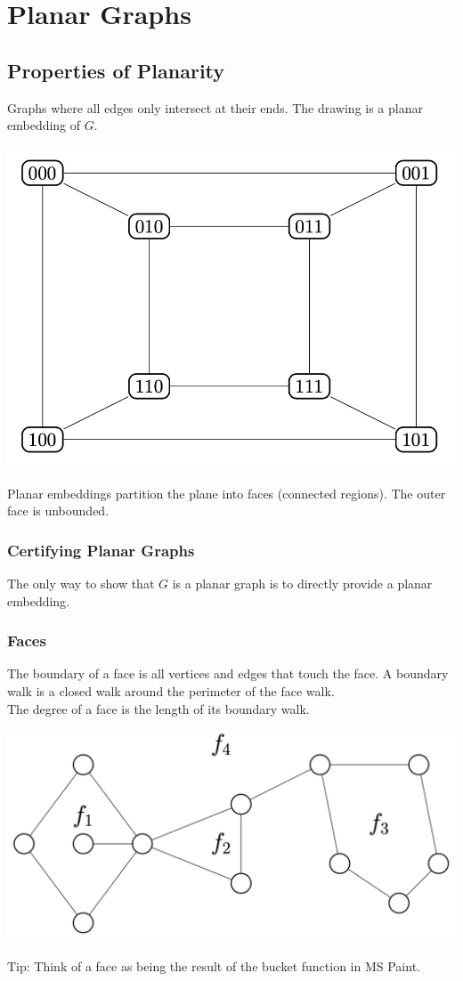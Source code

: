 \documentclass[11pt]{article}
\newcommand{\nl}{\\[5pt]}
\begin{document}
\newpage
\section{Planar Graphs}
\subsection{Properties of Planarity}
Graphs where all edges only intersect at their ends. The drawing is a planar embedding of $G$. 
\begin{center}
    \includegraphics[scale=0.4]{Figures/Hypercube.png}
\end{center}
Planar embeddings partition the plane into faces (connected regions). The outer face is unbounded.
\subsubsection{Certifying Planar Graphs}
The only way to show that $G$ is a planar graph is to directly provide a planar embedding. 
\subsubsection{Faces}
The boundary of a face is all vertices and edges that touch the face. A boundary walk is a closed walk around the perimeter of the face walk. \nl
The degree of a face is the length of its boundary walk.  
\begin{center}
    \includegraphics[scale=0.4]{Figures/Faces.png}
\end{center}
Tip: Think of a face as being the result of the bucket function in MS Paint. 
\end{document}
